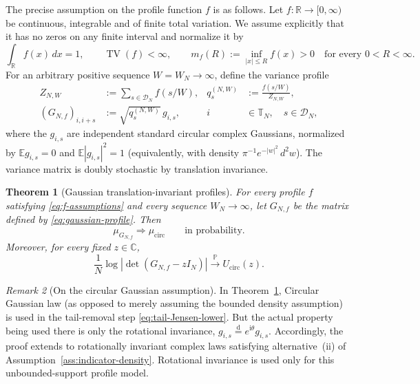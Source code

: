 \documentclass[11pt,reqno]{amsart}
\numberwithin{equation}{section}
\newtheorem{theorem}{Theorem}[section]
\theoremstyle{definition}
\theoremstyle{remark}
\newtheorem{remark}[theorem]{Remark}
\newcommand{\C}{\mathbb C}
\newcommand{\R}{\mathbb R}
\newcommand{\T}{\mathbb T}
\newcommand{\E}{\mathbb E}
\newcommand{\Pp}{\mathbb P}
\newcommand{\1}{\mathbf 1}
\newcommand{\cir}{\mathrm{circ}}
\DeclareMathOperator{\TV}{TV}
\begin{document}
The precise assumption on the profile function $f$ is as follows.
Let $f:\R\to[0,\infty)$ be continuous, integrable and of finite total
variation.  We assume explicitly that it has no zeros on any finite
interval and normalize it by
\begin{equation}\label{eq:f-assumptions}
 \int_{\R}f(x)\,dx=1,\qquad \TV(f)<\infty,\qquad
 m_f(R):=\inf_{|x|\le R}f(x)>0\quad\text{for every }0<R<\infty.
\end{equation}
For an arbitrary positive sequence $W=W_N\to\infty$, define the variance
profile
\begin{equation}\label{eq:gaussian-profile}
 \begin{aligned}
 Z_{N,W}&:=\sum_{s\in\mathcal D_N}f(s/W),
 &q_s^{(N,W)}&:=\frac{f(s/W)}{Z_{N,W}},\\
 (G_{N,f})_{i,i+s}&:=\sqrt{q_s^{(N,W)}}\,g_{i,s},
 &i&\in\T_N,\quad s\in\mathcal D_N,
 \end{aligned}
\end{equation}
where the $g_{i,s}$ are independent standard circular complex Gaussians,
normalized by $\E g_{i,s}=0$ and $\E|g_{i,s}|^2=1$ (equivalently, with
density $\pi^{-1}e^{-|w|^2}\,d^2w$).
The variance matrix is doubly stochastic by translation invariance.

\begin{theorem}[Gaussian translation-invariant profiles]
\label{thm:gaussian-profile}
For every profile $f$ satisfying \eqref{eq:f-assumptions} and every
sequence $W_N\to\infty$, let $G_{N,f}$ be the matrix defined by
\eqref{eq:gaussian-profile}.  Then
\[
 \mu_{G_{N,f}}\Longrightarrow\mu_{\cir}
 \qquad\text{in probability.}
\]
Moreover, for every fixed \(z\in\C\),
\[
 \frac1N\log|\det(G_{N,f}-zI_N)|
 \xrightarrow{\Pp}U_{\cir}(z).
\]
\end{theorem}

\begin{remark}[On the circular Gaussian assumption]
In Theorem~\ref{thm:gaussian-profile}, Circular Gaussian law (as opposed to merely assuming the bounded density assumption) is used in the
tail-removal step \eqref{eq:tail-Jensen-lower}. But the actual property being used there is only the rotational invariance,
\(g_{i,s}\stackrel{\mathrm d}=e^{\mathrm i\theta}g_{i,s}\).
Accordingly, the proof extends to rotationally invariant complex
laws satisfying alternative~(ii) of Assumption~\ref{ass:indicator-density}.
Rotational invariance is used only for this unbounded-support profile model.
\end{remark}
\end{document}
